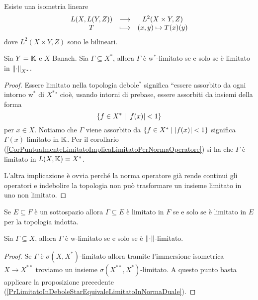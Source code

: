 \begin{exercise}
Esiste una isometria lineare
\[\begin{array}{ccc} {L(X,L(Y,Z))} & \longrightarrow & {L^2(X\times Y,Z)}\\ {T} & \longmapsto & {(x,y)\mapsto T(x)(y)} \end{array}\]
dove $L^2(X\times Y,Z)$ sono le bilineari.
\end{exercise}

\begin{proposition}\label{PrLimitatoInDeboleStarEquivaleLimitatoInNormaDuale}
Sia $Y=\mathbb{K}$ e $X$ Banach. Sia $\Gamma\subseteq X^\ast$, allora $\Gamma$ \`e w$^\ast$-limitato se e solo se \`e limitato in ${\left\Vert{\cdot}\right\Vert}_{X^\ast}$.
\end{proposition}
\begin{proof}
Essere limitato nella topologia debole$^\ast$ significa ``essere assorbito da ogni intorno w$^\ast$ di $X^\ast$" cio\`e, usando intorni di prebase, essere assorbiti da insiemi della forma
\[\left\{{f\in X^\ast\mid \left|{f(x)}\right|<1}\right\}\]
per $x\in X$. Notiamo che $\Gamma$ viene assorbito da $\left\{{f\in X^\ast\mid \left|{f(x)}\right|<1}\right\}$ significa $\Gamma(x)$ limitato in $\mathbb{K}$. Per il corollario (\ref{CorPuntualmenteLimitatoImplicaLimitatoPerNormaOperatore}) si ha che $\Gamma$ \`e limitato in $L(X,\mathbb{K})=X^\ast$.

L'altra implicazione \`e ovvia perch\'e la norma operatore gi\`a rende continui gli operatori e indebolire la topologia non pu\`o trasformare un insieme limitato in uno non limitato.
\end{proof}

\begin{remark}
Se $E\subseteq F$ \`e un sottospazio allora $\Gamma\subseteq E$ \`e limitato in $F$ se e solo se \`e limitato in $E$ per la topologia indotta.
\end{remark}

\begin{proposition}
Sia $\Gamma\subseteq X$, allora $\Gamma$ \`e w-limitato se e solo se \`e ${\left\Vert{\cdot}\right\Vert}$-limitato.
\end{proposition}
\begin{proof}
Se $\Gamma$ \`e $\sigma(X,X^\ast)$-limitato allora tramite l'immersione isometrica $X\to X^{\ast\ast}$ troviamo un insieme $\sigma(X^{\ast\ast},X^\ast)$-limitato. A questo punto basta applicare la proposizione precedente (\ref{PrLimitatoInDeboleStarEquivaleLimitatoInNormaDuale}).
\end{proof}
